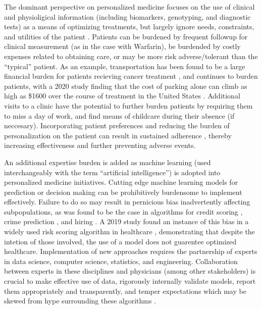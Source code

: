 The dominant perspective on personalized medicine focuses on the use of clinical and physioligical information (including biomarkers, genotyping, and diagnostic tests) as a means of optimizing treatments, but largely ignore needs, constraints, and utilities of the patient \cite{rogowski2015concepts, di2017personalized}. Patients can be burdened by frequent followup for clinical measurement (as in the case with Warfarin), be burdended by costly expenses related to obtaining care, or may be more risk adverse/tolerant than the ``typical'' patient. As an example, transportation has been found to be a large financial burden for patients recieving cancer treatment \cite{houts1984nonmedical}, and continues to burden patients, with a 2020 study finding that the cost of parking alone can climb as high as \$1600 over the course of treatment in the United States \cite{lee2020assessment}.  Additional visits to a clinic have the potential to further burden patients by requiring them to miss a day of work, and find means of childcare during their absence (if neccesary). Incorporating patient preferences and reducing the burden of personalization on the patient can result in sustained adherence \cite{elliott2008understanding}, thereby increasing effectiveness and further preventing adverse events.



An additional expertise burden is added as machine learning (used interchangeably with the term “artificial intelligence”) is adopted into personalized medicine initiatives.  Cutting edge machine learning models for prediction or decision making can be prohibitively burdensome to implement effectively. Failure to do so may result in pernicious bias inadvertently affecting subpopulations, as was found to be the case in algorithms for credit scoring \cite{barocas2016big}, crime prediction \cite{lum2016predict}, and hiring \cite{ajunwa2020paradox}.  A 2019 study found an instance of this bias in a widely used risk scoring algorithm in healthcare \cite{obermeyer2019dissecting}, demonstrating that despite the intetion of those involved, the use of a model does not guarentee optimized healthcare. Implementation of new approaches requires the partnership of experts in data science, computer science, statistics, and engineering.  Collaboration between experts in these disciplines and physicians (among other stakeholders) is crucial to make effective use of data, rigorously internally validate models, report them appropriately and transparently, and temper expectations which may be skewed from hype surrounding these algorithms \cite{frohlich2018hype}. 

